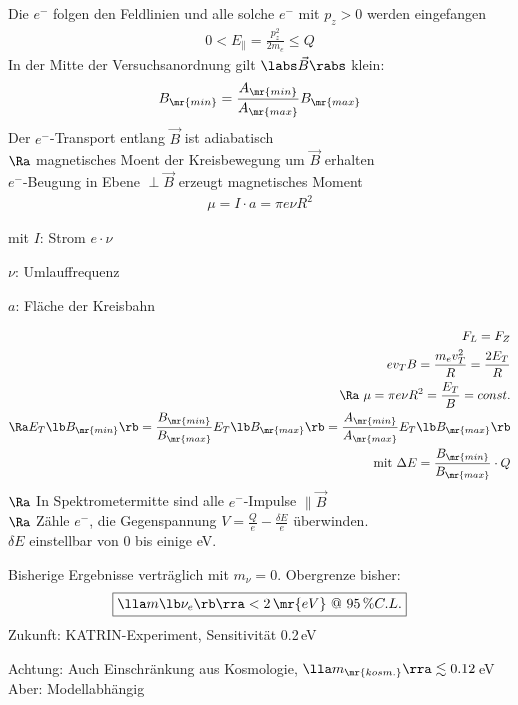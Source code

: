 Die $e^-$ folgen den Feldlinien und alle solche $e^-$ mit $p_z >0$ werden \glqq eingefangen\grqq{}
\begin{align}
0 < E_\parallel = \frac{p_z^2}{2m_e} \leq Q
\end{align}
In der Mitte der Versuchsanordnung gilt $\labs \vec{B}\rabs$ klein:
\begin{align}
B_\mr{min} = \frac{A_\mr{min}}{A_\mr{max}} B_\mr{max}
\end{align}
Der $e^-$-Transport entlang $\vec{B}$ ist adiabatisch\\
$\Ra$ magnetisches Moent der Kreisbewegung um $\vec{B}$ erhalten\\
$e^-$-Beugung in Ebene $\perp\vec{B}$ erzeugt magnetisches Moment
\begin{align}
\mu = I \cdot a = \pi e \nu R^2
\end{align}
\begin{compactitem}
\item[mit] $I$: Strom $e \cdot \nu$
\item[] $\nu$: Umlauffrequenz
\item[] $a$: Fläche der Kreisbahn
\end{compactitem}
\begin{align}
F_L = F_Z \nonumber\\
e v_T B = \frac{m_e v_T^2}{R} = \frac{2E_T}{R}\\
\Ra \ \mu = \pi e\nu R^2 = \frac{E_T}{B} = const.\\
\Ra E_T \lb B_\mr{min}\rb  = \frac{B_\mr{min}}{B_\mr{max}} E_T \lb B_\mr{max}\rb  = \frac{A_\mr{min}}{A_\mr{max}} E_T \lb B_\mr{max}\rb \\
\text{mit } \Delta E = \frac{B_\mr{min}}{B_\mr{max}} \cdot Q \nonumber
\end{align}
$\Ra$ In Spektrometermitte sind alle $e^-$-Impulse $\parallel\vec{B}$\\
$\Ra$ Zähle $e^-$, die Gegenspannung $V = \frac{Q}{e} - \frac{\delta E}{e}$ überwinden.\\
$\delta E$ einstellbar von 0 bis einige eV.

Bisherige Ergebnisse verträglich mit $m_\nu = 0$. Obergrenze bisher:
\begin{align}
\boxed{ \lla m\lb \nu_e\rb \rra < 2\,\mr{eV} \ @ \ 95\,\% C.L. }
\end{align}
Zukunft: KATRIN-Experiment, Sensitivität 0.2\,eV

Achtung: Auch Einschränkung aus Kosmologie, $\lla m_\mr{kosm.} \rra \lesssim 0.12$\,eV\\
Aber: Modellabhängig
\newpage
